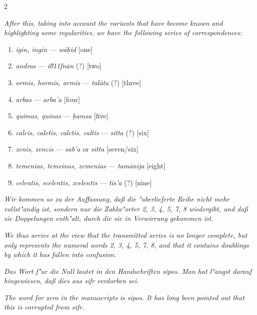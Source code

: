 \documentclass[10pt,a4paper]{article}
\begin{document}
\begin{paracol}{2}
\switchcolumn

\textit{After this, taking into account the variants that have become known and highlighting some regularities, we have the following series of correspondences:}

\begin{enumerate}
\item[(1)] \textit{igin, ingin} --- \textit{w\=a\d{h}id} [one]
\item[(2)] \textit{andras} --- \textit{i\u011fn\=an} (?) [two]
\item[(3)] \textit{ormis, hormis, armis} --- \textit{tal\=ata} (?) [three]
\item[(4)] \textit{arbas} --- \textit{arba'a} [four]
\item[(5)] \textit{quimas, quinas} --- \textit{\d{h}amsa} [five]
\item[(6)] \textit{calcis, caletis, calctis, caltis} --- \textit{sitta} (?) [six]
\item[(7)] \textit{zenis, zencis} --- \textit{sab'a} or \textit{sitta} [seven/six]
\item[(8)] \textit{temenias, temeinas, zemenias} --- \textit{tam\=anija} [eight]
\item[(9)] \textit{celentis, scelentis, zcelentis} --- \textit{tis'a} (?) [nine]
\end{enumerate}

\switchcolumn*

\textit{Wir kommen so zu der Auffassung, da\ss{} die "uberlieferte Reihe nicht mehr vollst"andig ist, sondern nur die Zahlw"orter 2, 3, 4, 5, 7, 8 wiedergibt, und da\ss{} sie Doppelungen enth"alt, durch die sie in Verwirrung gekommen ist.}

\switchcolumn

\textit{We thus arrive at the view that the transmitted series is no longer complete, but only represents the numeral words 2, 3, 4, 5, 7, 8, and that it contains doublings by which it has fallen into confusion.}

\switchcolumn*

\textit{Das Wort f"ur die Null lautet in den Handschriften \textit{sipos}. Man hat l"angst darauf hingewiesen, da\ss{} dies aus \textit{sifr} verdorben sei.}

\switchcolumn

\textit{The word for zero in the manuscripts is \textit{sipos}. It has long been pointed out that this is corrupted from \textit{sifr}.}

\switchcolumn*


\end{paracol}
\end{document}
